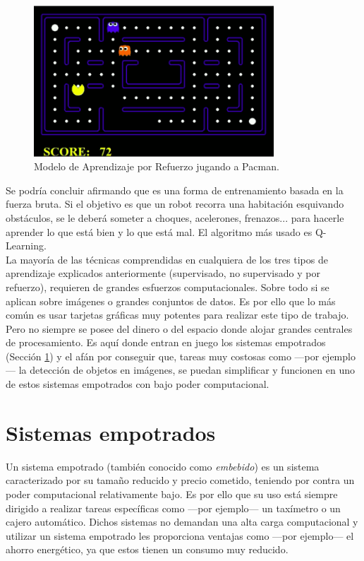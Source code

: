 \begin{figure} [h!]
  \begin{center}
    \includegraphics[width=9cm]{figs/pacman.png}
  \end{center}
  \caption{Modelo de Aprendizaje por Refuerzo jugando a Pacman.}
  \label{fig:pacman}
\end{figure}

Se podría concluir afirmando que es una forma de entrenamiento basada en la fuerza bruta. Si el objetivo es que un robot recorra una habitación esquivando obstáculos, se le deberá someter a choques, acelerones, frenazos... para hacerle aprender lo que está bien y lo que está mal. El algoritmo más usado es Q-Learning.\\

La mayoría de las técnicas comprendidas en cualquiera de los tres tipos de aprendizaje explicados anteriormente (supervisado, no supervisado y por refuerzo), requieren de grandes esfuerzos computacionales. Sobre todo si se aplican sobre imágenes o grandes conjuntos de datos. Es por ello que lo más común es usar tarjetas gráficas muy potentes para realizar este tipo de trabajo. Pero no siempre se posee del dinero o del espacio donde alojar grandes centrales de procesamiento. Es aquí donde entran en juego los sistemas empotrados (Sección \ref{sec:empotrados}) y el afán por conseguir que, tareas muy costosas como ---por ejemplo--- la detección de objetos en imágenes, se puedan simplificar y funcionen en uno de estos sistemas empotrados con bajo poder computacional.

\section{Sistemas empotrados}
\label{sec:empotrados}
Un sistema empotrado (también conocido como \textit{embebido}) es un sistema caracterizado por su tamaño reducido y precio cometido, teniendo por contra un poder computacional relativamente bajo. Es por ello que su uso está siempre dirigido a realizar tareas específicas como ---por ejemplo--- un taxímetro o un cajero automático. Dichos sistemas no demandan una alta carga computacional y utilizar un sistema empotrado les proporciona ventajas como ---por ejemplo--- el ahorro energético, ya que estos tienen un consumo muy reducido.\\

